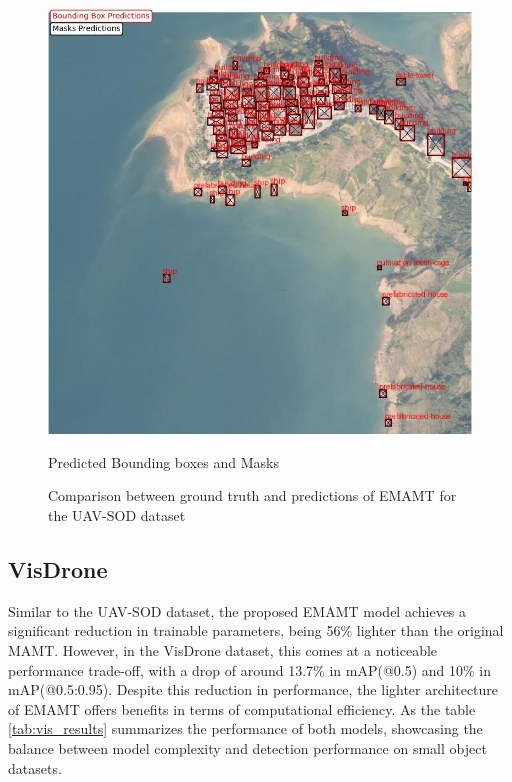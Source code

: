 \begin{figure}[!h]
\begin{minipage}{0.4\textwidth}
      \includegraphics[scale=0.35]{Figures/uav_predictions.jpg}
      \caption{Predicted Bounding boxes and Masks}
    \end{minipage}
    \caption{Comparison between ground truth and predictions of EMAMT for the UAV-SOD dataset}
    \label{fig:uav-images}
\end{figure}


\subsection{VisDrone}

Similar to the UAV-SOD dataset, the proposed EMAMT model achieves a significant reduction in trainable parameters, being 56\% lighter than the original MAMT. 
However, in the VisDrone dataset, this comes at a noticeable performance trade-off, with a drop of around 13.7\% in mAP(@0.5) and 10\% in mAP(@0.5:0.95). Despite 
this reduction in performance, the lighter architecture of EMAMT offers benefits in terms of computational efficiency. As the table \ref{tab:vis_results} summarizes 
the performance of both models, showcasing the balance between model complexity and detection performance on small object datasets.


